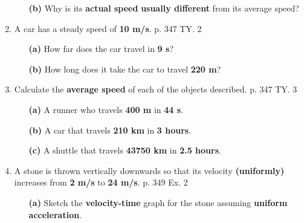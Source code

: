 \documentclass[A4,12pt]{article}
\begin{document}
\begin{enumerate}[label=\bfseries (\arabic*)]
\begin{itemize}
%
%

%
%
%
    \item[\bf (b)] Why is its \textbf{actual speed} \textbf{usually different} from its average speed?
%
%

%
%
%
\end{itemize}
%
%
%
%
%
%
%
%
%
%
%
%
\item A car has a steady speed of \textbf{10 m/s}. \cite{CCEADA} p. 347 TY. 2
\begin{itemize}
    \item[\bf (a)] How far does the car travel in \textbf{9 s}?
    \item[\bf (b)] How long does it take the car to travel \textbf{220 m}?
\end{itemize}
%
%
%
%
%
%
%
%
%
%
%
%
%
%
%
%
%
\item Calculate the \textbf{average speed} of each of the objects described. \cite{CCEADA} p. 347 TY. 3
%
\begin{itemize}
    \item[\bf (a)] A runner who travels \textbf{400 m} in \textbf{44 s}.
    \item[\bf (b)] A car that travels \textbf{210 km} in \textbf{3 hours}.
    \item[\bf (c)] A shuttle that travels \textbf{43750 km} in \textbf{2.5 hours}. 
\end{itemize}
%
%
%
%
%
%
%
%
%
%
%
%
%
%
\item A stone is thrown vertically downwards so that its velocity \textbf{(uniformly)} increases from \textbf{2 m/s} to \textbf{24 m/s}.  \cite{CCEADA,Triguero} p. 349 Ex. 2
\begin{itemize}
    \item[\bf (a)] Sketch the \textbf{velocity-time} graph for the stone assuming \textbf{uniform acceleration}.
    \begin{figure}[H]

\end{figure}
\end{itemize}
\end{enumerate}
\end{document}
